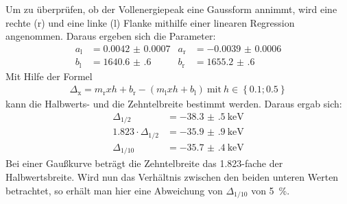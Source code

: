 Um zu überprüfen, ob der Vollenergiepeak eine Gaussform annimmt, wird eine
rechte (r) und eine linke (l) Flanke mithilfe einer linearen Regression
angenommen. Daraus ergeben sich die Parameter:
\begin{align*}
	a_\text{l} &= \num{0.0042(7)} & a_\text{r} &= \num{-0.0039(6)} \\
	b_\text{l} &= \num{1640.6(6)} & b_\text{r} &= \num{1655.2(6)}
\end{align*}
Mit Hilfe der Formel
\begin{align*}
	\Delta_\text{x} = m_\text{r}xh + b_\text{r} - \left(m_\text{l}xh + b_\text{l}\right)\ \text{mit}\ h \in \left\{\num{0.1}; \num{0.5}\right\}
\end{align*}
kann die Halbwerts- und die Zehntelbreite bestimmt werden. Daraus ergab sich:
\begin{align*}
  \Delta_{1/2} &= \SI{-38.3(5)}{\kilo\electronvolt} \\
	\num{1.823} \cdot \Delta_{1/2} &= \SI{-35.9(9)}{\kilo\electronvolt} \\
  \Delta_{1/10} &= \SI{-35.7(4)}{\kilo\electronvolt}
\end{align*}
Bei einer Gaußkurve beträgt die Zehntelbreite das \num{1.823}-fache der
Halbwertsbreite.
Wird nun das Verhältnis zwischen den beiden unteren Werten
betrachtet, so erhält man hier eine Abweichung von
$\Delta_{1/10}$ von \SI{5}{\percent}.

